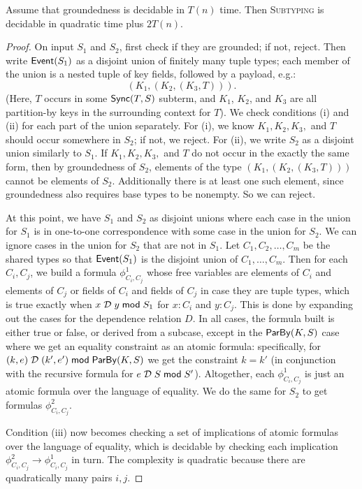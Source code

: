 \begin{theorem}
\label{thm:stream-relaxation-decidable}
Assume that groundedness is decidable in $T(n)$ time.
Then \textsc{Subtyping} is decidable in quadratic time plus $2T(n)$.
\end{theorem}
\begin{proof}
On input $S_1$ and $S_2$, first check if they are grounded; if not, reject.
Then write $\mathsf{Event}(S_1)$ as a disjoint union of finitely many tuple types; each member of the union is a nested tuple of key fields, followed by a payload, e.g.:
\[
(K_1, (K_2, (K_3, T))).
\]
(Here, $T$ occurs in some $\mathsf{Sync}({T}, S)$ subterm, and $K_1$, $K_2$, and $K_3$ are all partition-by keys in the surrounding context for $T$).
We check conditions (i) and (ii) for each part of the union separately.
For (i), we know $K_1, K_2, K_3,$ and $T$ should occur somewhere in $S_2$; if not, we reject.
For (ii), we write $S_2$ as a disjoint union similarly to $S_1$. If $K_1, K_2, K_3,$ and $T$ do not occur in the exactly the same form, then by groundedness of $S_2$, elements of the type $(K_1, (K_2, (K_3, T)))$ cannot be elements of $S_2$. Additionally there is at least one such element, since groundedness also requires base types to be nonempty. So we can reject.

At this point, we have $S_1$ and $S_2$ as disjoint unions where each case in the union for $S_1$ is in one-to-one correspondence with some case in the union for $S_2$. We can ignore cases in the union for $S_2$ that are not in $S_1$.
Let $C_1, C_2, \ldots, C_m$ be the shared types so that $\mathsf{Event}(S_1)$ is the disjoint union of $C_1, \ldots, C_m$.
Then for each $C_i, C_j$,
we build a formula $\phi^1_{C_i, C_j}$ whose free variables are elements of $C_i$ and elements of $C_j$ or fields of $C_i$ and fields of $C_j$ in case they are tuple types,
which is true exactly when
$x \;\mathcal{D}\; y \;\mathsf{mod}\; {S_1}$ for $x : C_i$ and $y : C_j$.
This is done by expanding out the cases for the dependence relation $D$.
In all cases, the formula built is either true or false, or derived from a subcase,
except in the $\mathsf{ParBy}({K}, S)$ case where
we get an equality constraint as an atomic formula:
specifically, for $(k, e) \;\mathcal{D}\; (k', e') \;\mathsf{mod}\; {\mathsf{ParBy}({K}, S)}$
we get the constraint $k = k'$ (in conjunction with the recursive formula for $e \;\mathcal{D}\; S \;\mathsf{mod}\; {S'}$).
Altogether, each $\phi^1_{C_i, C_j}$ is just an atomic formula over the
language of equality.
We do the same for $S_2$ to get formulas $\phi^2_{C_i, C_j}$.

Condition (iii) now becomes checking a set of implications
of atomic formulas over the language of equality, which is
decidable by checking each implication
$\phi^2_{C_i, C_j} \to \phi^1_{C_i, C_j}$
in turn.
The complexity is quadratic because there are quadratically many pairs $i, j$.
\end{proof}

